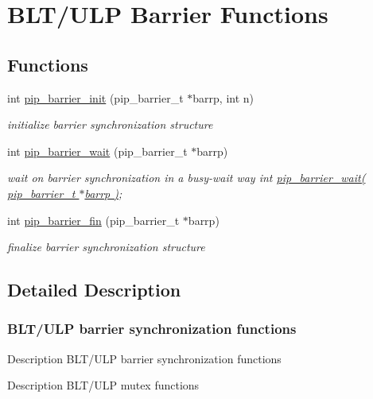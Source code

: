 \hypertarget{group__ULP-4-barrier}{\section{B\-L\-T/\-U\-L\-P Barrier Functions}
\label{group__ULP-4-barrier}
}
\subsection*{Functions}
\begin{DoxyCompactItemize}
\item 
int \hyperlink{group__ULP-4-barrier_ga84022f9c64f431e7d513342aeed0b61e}{pip\-\_\-barrier\-\_\-init} (pip\-\_\-barrier\-\_\-t $\ast$barrp, int n)
\begin{DoxyCompactList}\small\item\em initialize barrier synchronization structure \end{DoxyCompactList}\item 
int \hyperlink{group__ULP-4-barrier_gaca103c9732a8e28ee8faf79ef4a69e4f}{pip\-\_\-barrier\-\_\-wait} (pip\-\_\-barrier\-\_\-t $\ast$barrp)
\begin{DoxyCompactList}\small\item\em wait on barrier synchronization in a busy-\/wait way int \hyperlink{group__ULP-4-barrier_gaca103c9732a8e28ee8faf79ef4a69e4f}{pip\-\_\-barrier\-\_\-wait( pip\-\_\-barrier\-\_\-t $\ast$barrp )}; \end{DoxyCompactList}\item 
int \hyperlink{group__ULP-4-barrier_ga70dab15271b84fe05d7088a6cf8bf784}{pip\-\_\-barrier\-\_\-fin} (pip\-\_\-barrier\-\_\-t $\ast$barrp)
\begin{DoxyCompactList}\small\item\em finalize barrier synchronization structure \end{DoxyCompactList}\end{DoxyCompactItemize}


\subsection{Detailed Description}
\hypertarget{ulp-barrier}{}\subsubsection{B\-L\-T/\-U\-L\-P barrier synchronization functions}\label{ulp-barrier}
\begin{DoxyParagraph}{Description}
B\-L\-T/\-U\-L\-P barrier synchronization functions
\end{DoxyParagraph}
\begin{DoxyParagraph}{Description}
B\-L\-T/\-U\-L\-P mutex functions 
\end{DoxyParagraph}


